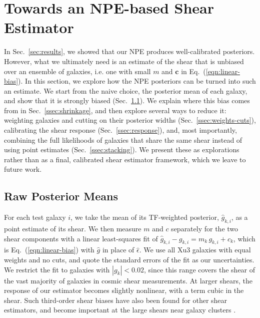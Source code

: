 \section{Towards an NPE-based Shear Estimator}
\label{sec:shear}

In Sec.~\ref{sec:results}, we showed that our NPE produces well-calibrated posteriors. However, what we ultimately need is an estimate of the shear that is unbiased over an ensemble of galaxies, i.e. one with small $m$ and $\mathbf{c}$ in Eq.~(\ref{eqn:linear-bias}). In this section, we explore how the NPE posteriors can be turned into such an estimate. We start from the naive choice, the posterior mean of each galaxy, and show that it is strongly biased (Sec.~\ref{ssec:raw-bias}). We explain where this bias comes from in Sec.~\ref{ssec:shrinkage}, and then explore several ways to reduce it: weighting galaxies and cutting on their posterior widths (Sec.~\ref{ssec:weights-cuts}), calibrating the shear response (Sec.~\ref{ssec:response}), and, most importantly, combining the full likelihoods of galaxies that share the same shear instead of using point estimates (Sec.~\ref{ssec:stacking}). We present these as explorations rather than as a final, calibrated shear estimator framework, which we leave to future work.

\subsection{Raw Posterior Means}
\label{ssec:raw-bias}

For each test galaxy $i$, we take the mean of its TF-weighted posterior, $\hat{g}_{k,i}$, as a point estimate of its shear. We then measure $m$ and $c$ separately for the two shear components with a linear least-squares fit of $\hat{g}_{k,i} - g_{k,i} = m_k\, g_{k,i} + c_k$, which is Eq.~(\ref{eqn:linear-bias}) with $\hat{g}$ in place of $\hat{\epsilon}$. We use all Xu3 galaxies with equal weights and no cuts, and quote the standard errors of the fit as our uncertainties. We restrict the fit to galaxies with $|g_k| < 0.02$, since this range covers the shear of the vast majority of galaxies in cosmic shear measurements. At larger shears, the response of our estimator becomes slightly nonlinear, with a term cubic in the shear. Such third-order shear biases have also been found for other shear estimators, and become important at the large shears near galaxy clusters \citep{Anacal, AnaCalCluster}.

